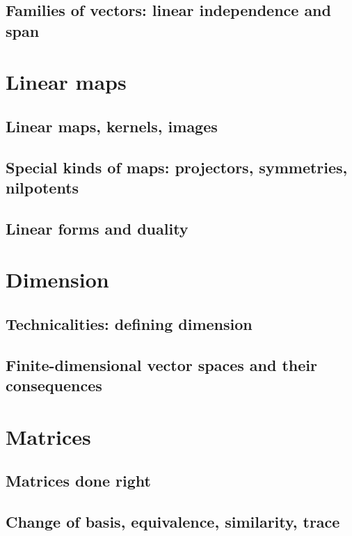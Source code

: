 \documentclass{book}
\theoremstyle{plain}
\theoremstyle{definition}
\theoremstyle{remark}
\begin{document}
\section{Families of vectors: linear independence and span}

\chapter{Linear maps}

\section{Linear maps, kernels, images}

\section{Special kinds of maps: projectors, symmetries, nilpotents}

\section{Linear forms and duality}

\chapter{Dimension}

\section{Technicalities: defining dimension}

\section{Finite-dimensional vector spaces and their consequences}

\chapter{Matrices}

\section{Matrices done right}

\section{Change of basis, equivalence, similarity, trace}
\end{document}

